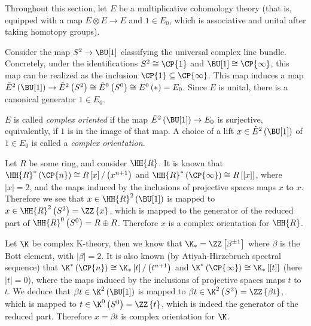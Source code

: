 Throughout this section, let $E$ be a multiplicative cohomology theory (that is, equipped with a map $E \otimes E \to E$ and $1 \in E_0$, which is associative and unital after taking homotopy groups).

Consider the map $S^2 \to \BU[1]$ classifying the universal complex line bundle.
Concretely, under the identifications $S^2 \cong \CP{1}$ and $\BU[1] \cong \CP{\infty}$, this map can be realized as the inclusion $\CP{1} \subseteq \CP{\infty}$.
This map induces a map
$
\tilde{E}^2\left(\BU[1]\right)
\to \tilde{E}^2\left(S^2\right)
\cong \tilde{E}^0\left(S^0\right)
\cong E^0\left(*\right)
= E_0
$.
Since $E$ is unital, there is a canonical generator $1 \in E_0$.

\begin{definition}
	$E$ is called \emph{complex oriented} if the map $\tilde{E}^2\left(\BU[1]\right) \to E_0$ is surjective, equivalently, if $1$ is in the image of that map.
	A choice of a lift $x \in \tilde{E}^2\left(\BU[1]\right)$ of $1 \in E_0$ is called a \emph{complex orientation}.
\end{definition}

\begin{example}
	Let $R$ be some ring, and consider $\HH{R}$.
	It is known that
	$\HH{R}^*\left(\CP{n}\right) \cong R \left[x\right] / \left(x^{n+1}\right)$
	and
	$\HH{R}^*\left(\CP{\infty}\right) \cong R \left[\left[x\right]\right]$,
	where $\left|x\right| = 2$,
	and the maps induced by the inclusions of projective spaces maps $x$ to $x$.
	Therefore we see that $x \in \HH{R}^2\left(\BU[1]\right)$ is mapped to $x \in \HH{R}^2\left(S^2\right) = \ZZ\left\{x\right\}$, which is mapped to the generator of the reduced part of $\HH{R}^0\left(S^0\right) = R \oplus R$.
	Therefore $x$ is a complex orientation for $\HH{R}$.
\end{example}

\begin{example}
	Let $\K$ be complex K-theory, then we know that $\K_* = \ZZ\left[\beta^{\pm 1}\right]$ where $\beta$ is the Bott element, with $\left|\beta\right| = 2$.
	It is also known (by Atiyah-Hirzebruch spectral sequence) that
	$\K^*\left(\CP{n}\right) \cong \K_* \left[t\right] / \left(t^{n+1}\right)$
	and
	$\K^*\left(\CP{\infty}\right) \cong \K_* \left[\left[t\right]\right]$
	(here $\left|t\right| = 0$),
	where the maps induced by the inclusions of projective spaces maps $t$ to $t$.
	We deduce that $\beta t \in \K^2\left(\BU[1]\right)$ is mapped to $\beta t \in \K^2\left(S^2\right) = \ZZ\left\{\beta t\right\}$, which is mapped to $t \in \K^0\left(S^0\right) = \ZZ\left\{t\right\}$, which is indeed the generator of the reduced part.
	Therefore $x = \beta t$ is complex orientation for $\K$.
\end{example}

